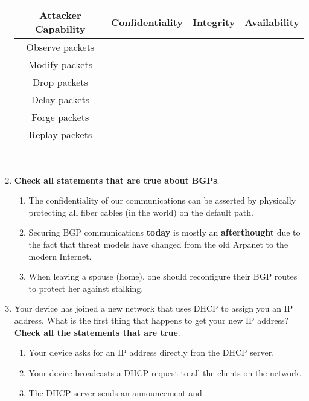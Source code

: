 \documentclass{article} %
\newcommand{\incorrectOption}{\textbf{\Circle}}
\begin{document}
\begin{enumerate}[leftmargin=*, label=\textbf{Q\arabic*}, itemsep=-5pt]
  \begin{tabular}{|c|c|c|c|} \hline
     \textbf{Attacker Capability} & \textbf{Confidentiality} & \textbf{Integrity} & \textbf{Availability}\\ \hline
     Observe packets & \incorrectOption & \incorrectOption & \incorrectOption\\ \hline
     Modify packets & \incorrectOption & \incorrectOption & \incorrectOption\\ \hline
     Drop packets & \incorrectOption & \incorrectOption & \incorrectOption\\ \hline
     Delay packets & \incorrectOption & \incorrectOption & \incorrectOption\\ \hline
     Forge packets & \incorrectOption & \incorrectOption & \incorrectOption\\ \hline
     Replay packets & \incorrectOption & \incorrectOption & \incorrectOption\\\hline
  \end{tabular}  \\
%
  \item \textbf{Check all statements that are true about BGPs}.
  \begin{enumerate}[itemsep=-3.5pt, label={}]
  \item[\incorrectOption]  The confidentiality of our communications
    can be asserted by physically protecting all fiber cables (in the
    world) on the default path.  
  \item[\incorrectOption] Securing BGP communications \textbf{today}
    is mostly an \textbf{afterthought} due to the fact that threat
    models have changed from the old Arpanet to the modern Internet.
  \item[\incorrectOption]  When leaving a spouse (home), one should
    reconfigure their BGP routes to protect her against stalking.
  \end{enumerate}
%
  \item Your device has joined a new network that uses DHCP to assign
    you an IP address. What is the first thing that happens to get
    your new IP address? \textbf{Check all the statements that are true}.
  \begin{enumerate}[itemsep=-3.5pt, label={}]
  \item[\incorrectOption]  Your device asks for an IP address
    directly fron the DHCP server. 
  \item[\incorrectOption]  Your device broadcasts a DHCP request to
    all the clients on the network. 
  \item[\incorrectOption] The DHCP server sends an announcement and

\end{enumerate}
\end{enumerate}
\end{document}
